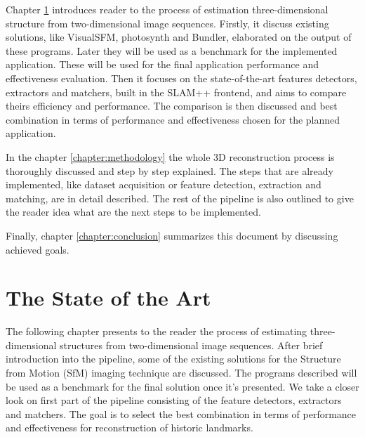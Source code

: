 Chapter \ref{chapter:the-state-of-the-art} introduces reader to the process of estimation three-dimensional structure from two-dimensional image sequences. Firstly, it discuss existing solutions, like VisualSFM, photosynth and Bundler, elaborated on the output of these programs. Later they will be used as a benchmark for the implemented application. These will be used for the final application performance and effectiveness evaluation. Then it focuses on the state-of-the-art features detectors, extractors and matchers, built in the SLAM++ frontend, and aims to compare theirs efficiency and performance. The comparison is then discussed and best combination in terms of performance and effectiveness chosen for the planned application.

In the chapter \ref{chapter:methodology} the whole 3D reconstruction process is thoroughly discussed and step by step explained. The steps that are already implemented, like dataset acquisition or feature detection, extraction and matching, are in detail described. The rest of the pipeline is also outlined to give the reader idea what are the next steps to be implemented. 

Finally, chapter \ref{chapter:conclusion} summarizes this document by discussing achieved goals.

\chapter{The State of the Art}
\label{chapter:the-state-of-the-art}
The following chapter presents to the reader the process of estimating three-dimensional structures from two-dimensional image sequences. After brief introduction into the pipeline, some of the existing solutions for the Structure from Motion (SfM) imaging technique are discussed. The programs described will be used as a benchmark for the final solution once it's presented. We take a closer look on first part of the pipeline consisting of the feature detectors, extractors and matchers. The goal is to select the best combination in terms of performance and effectiveness for reconstruction of historic landmarks. 

